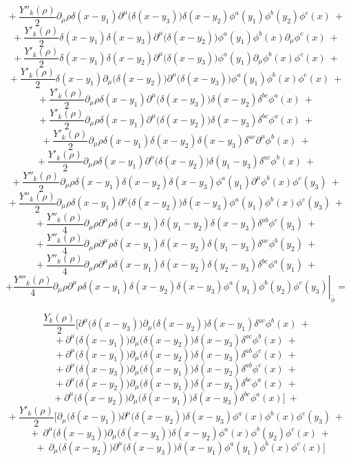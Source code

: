 $$+\ \frac{Y''_k(\rho)}{2}\partial_\mu\rho\delta(x-y_1)\partial^\mu\big(\delta(x - y_3)\big)\delta(x - y_2) \phi^a(y_1)\phi^b(y_2)\phi^c(x) \ +$$
$$+\ \frac{Y'_k(\rho)}{2}\delta(x-y_1)\delta(x - y_3)\partial^\mu\big(\delta(x - y_2)\big) \phi^a(y_1)\phi^b(x)\partial_\mu\phi^c(x) \ +$$
$$+\ \frac{Y'_k(\rho)}{2}\delta(x-y_1)\delta(x - y_2)\partial^\mu\big(\delta(x - y_3)\big) \phi^a(y_1)\partial_\mu\phi^b(x)\phi^c(x) \ +$$
$$+\ \frac{Y'_k(\rho)}{2}\delta(x-y_1)\partial_\mu\big(\delta(x - y_2)\big)\partial^\mu\big(\delta(x - y_3)\big) \phi^a(y_1)\phi^b(x)\phi^c(x) \ +$$
$$+\ \frac{Y'_k(\rho)}{2}\partial_\mu\rho\delta(x-y_1)\partial^\mu\big(\delta(x - y_3)\big)\delta(x - y_2) \delta^{bc}\phi^a(x) \ +$$
$$+\ \frac{Y'_k(\rho)}{2}\partial_\mu\rho\delta(x-y_1)\partial^\mu\big(\delta(x - y_2)\big)\delta(x - y_3) \delta^{bc}\phi^a(x) \ +$$
$$+\ \frac{Y'_k(\rho)}{2}\partial_\mu\rho\delta(x-y_1)\delta(x - y_2)\delta(x - y_3) \delta^{ac}\partial^\mu\phi^b(x) \ +$$
$$+\ \frac{Y'_k(\rho)}{2}\partial_\mu\rho\delta(x-y_1)\partial^\mu\big(\delta(x - y_2)\big)\delta(y_1 - y_3) \delta^{ac}\phi^b(x) \ +$$
$$+\ \frac{Y''_k(\rho)}{2}\partial_\mu\rho\delta(x-y_1)\delta(x - y_2)\delta(x - y_3) \phi^a(y_1) \partial^\mu\phi^b(x)\phi^c(y_3) \ +$$
$$+\ \frac{Y''_k(\rho)}{2}\partial_\mu\rho\delta(x-y_1)\partial^\mu\big(\delta(x - y_2)\big)\delta(x - y_3) \phi^a(y_1)\phi^b(x)\phi^c(y_3) \ +$$
$$+\ \frac{Y''_k(\rho)}{4}\partial_\mu\rho\partial^\mu\rho\delta(x-y_1)\delta(y_1 - y_2)\delta(x - y_3) \delta^{ab}\phi^c(y_3) \ +$$
$$+\ \frac{Y''_k(\rho)}{4}\partial_\mu\rho\partial^\mu\rho\delta(x-y_1)\delta(x - y_2)\delta(y_1 - y_3) \delta^{ac}\phi^b(y_2) \ +$$
$$+\ \frac{Y''_k(\rho)}{4}\partial_\mu\rho\partial^\mu\rho\delta(x-y_1)\delta(x - y_2)\delta(y_2 - y_3) \delta^{bc}\phi^a(y_1) \ +$$
$$+\left. \frac{Y'''_k(\rho)}{4}\partial_\mu\rho\partial^\mu\rho\delta(x-y_1)\delta(x - y_2)\delta(x - y_3) \phi^a(y_1)\phi^b(y_2)\phi^c(y_3)\right|_{\bar{\phi}} =$$



$$ \frac{Y_k(\rho)}{2}\Big[\partial^\mu\big(\delta(x-y_3)\big)\partial_\mu\big(\delta(x - y_2)\big)\delta(x - y_1)\delta^{ac}\phi^b(x) \ +$$
$$+\ \partial^\mu\big(\delta(x-y_1)\big)\partial_\mu\big(\delta(x - y_2)\big)\delta(x - y_3)\delta^{ac}\phi^b(x) \ +$$
$$+\ \partial^\mu\big(\delta(x-y_1)\big)\partial_\mu\big(\delta(x - y_2)\big)\delta(x - y_3)\delta^{ab}\phi^c(x) \ +$$
$$+\ \partial^\mu\big(\delta(x-y_3)\big)\partial_\mu\big(\delta(x - y_1)\big)\delta(x - y_2)\delta^{ab}\phi^c(x) \ +$$
$$+\ \partial^\mu\big(\delta(x-y_2)\big)\partial_\mu\big(\delta(x - y_1)\big)\delta(x - y_3)\delta^{bc}\phi^a(x) \ +$$
$$+\ \partial^\mu\big(\delta(x-y_2)\big)\partial_\mu\big(\delta(x - y_1)\big)\delta(x - y_3)\delta^{bc}\phi^a(x)\Big] \ +$$
$$+\ \frac{Y'_k(\rho)}{2}\Big[\partial_\mu\big(\delta(x-y_1)\big)\partial^\mu\big(\delta(x - y_2)\big)\delta(x - y_3) \phi^a(x)\phi^b(x)\phi^c(y_3) \ +$$
$$\ \ \ +\ \partial^\mu\big(\delta(x-y_3)\big)\partial_\mu\big(\delta(x - y_3)\big)\delta(x - y_2) \phi^a(x)\phi^b(y_2) \phi^c(x) \ +$$
$$\ \ \ +\ \partial_\mu\big(\delta(x - y_2)\big)\partial^\mu\big(\delta(x - y_3)\big) \delta(x-y_1)\phi^a(y_1)\phi^b(x)\phi^c(x)\Big]$$



